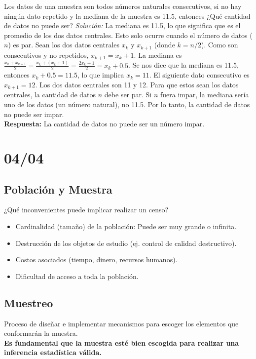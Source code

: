 \documentclass[12pt, letterpaper]{article}
\begin{document}
\vspace{1em}
\noindent Los datos de una muestra son todos números naturales consecutivos, si no hay ningún dato repetido y la mediana de la muestra es 11.5, entonces ¿Qué cantidad de datos no puede ser?
\textit{Solución:}
La mediana es 11.5, lo que significa que es el promedio de los dos datos centrales. Esto solo ocurre cuando el número de datos ($n$) es par.
Sean los dos datos centrales $x_k$ y $x_{k+1}$ (donde $k=n/2$). Como son consecutivos y no repetidos, $x_{k+1} = x_k + 1$.
La mediana es $\frac{x_k + x_{k+1}}{2} = \frac{x_k + (x_k+1)}{2} = \frac{2x_k+1}{2} = x_k + 0.5$.
Se nos dice que la mediana es 11.5, entonces $x_k + 0.5 = 11.5$, lo que implica $x_k = 11$. El siguiente dato consecutivo es $x_{k+1} = 12$.
Los dos datos centrales son 11 y 12.
Para que estos sean los datos centrales, la cantidad de datos $n$ debe ser par.
Si $n$ fuera impar, la mediana sería uno de los datos (un número natural), no 11.5.
Por lo tanto, la cantidad de datos no puede ser impar. \\
\textbf{Respuesta:} La cantidad de datos no puede ser un número impar.
\newpage

\section{04/04}
\subsection{Población y Muestra}
¿Qué inconvenientes puede implicar realizar un censo?
\begin{itemize}
    \item Cardinalidad (tamaño) de la población: Puede ser muy grande o infinita. %
    \item Destrucción de los objetos de estudio (ej. control de calidad destructivo). %
    \item Costos asociados (tiempo, dinero, recursos humanos). %
    \item Dificultad de acceso a toda la población. %
\end{itemize}

\subsection{Muestreo}
Proceso de diseñar e implementar mecanismos para escoger los elementos que conformarán la muestra. \\
\textbf{Es fundamental que la muestra esté bien escogida para realizar una inferencia estadística válida.} %
\end{document}
